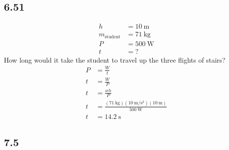 \documentclass{article}
\begin{document}
\subsection{6.51}

\begin{align*}
	h & = \SI{10}{\meter} \\
	m_\text{student} & = \SI{71}{\kilogram} \\
	P & = \SI{500}{\watt} \\
	t & = ?
\end{align*}
How long would it take the student to travel up the three flights of stairs?
\begin{align*}
	P & = \frac{W}{t} \\
	t & = \frac{W}{P} \\
	t & = \frac{wh}{P} \\
	t & = \frac{(\SI{71}{\kilogram})(\SI{10}{\meter \per \second \squared})(\SI{10}{\meter})}{\SI{500}{\watt}} \\
	t & = \SI{14.2}{\second}
\end{align*}

\subsection{7.5}
\end{document}
